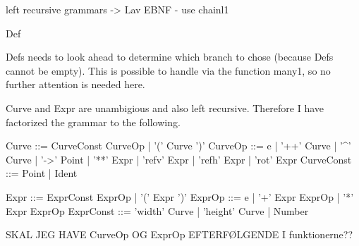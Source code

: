 left recursive grammars -> Lav EBNF - use chainl1

Def

Defs needs to look ahead to determine which branch to chose (because Defs cannot be empty). This is possible to handle via the function many1, so no further attention is needed here.

Curve and Expr are unambigious and also left recursive. 
Therefore I have factorized the grammar to the following.


Curve ::= CurveConst CurveOp | '(' Curve ')'
CurveOp ::= e 
            | '++' Curve 
            | '^' Curve
            | '->' Point
            | '**' Expr
            | 'refv' Expr
            | 'refh' Expr
            | 'rot' Expr
CurveConst ::= Point | Ident

Expr ::= ExprConst ExprOp | '(' Expr ')'
ExprOp ::=  e 
            | '+' Expr ExprOp
            | '*' Expr ExprOp
ExprConst ::= 'width' Curve 
            | 'height' Curve 
            | Number

SKAL JEG HAVE CurveOp OG ExprOp EFTERFØLGENDE I funktionerne??
